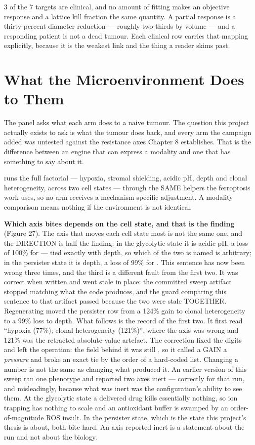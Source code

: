 \documentclass[11pt,twoside,openright]{report}
\begin{document}
3 of the 7 targets are clinical, and no amount of fitting makes an objective response and a lattice kill fraction the same quantity. A partial response is a thirty-percent diameter reduction --- roughly two-thirds by volume --- and a responding patient is not a dead tumour. Each clinical row carries that mapping explicitly, because it is the weakest link and the thing a reader skims past.

\section{What the Microenvironment Does to Them}

The panel asks what each arm does to a naive tumour. The question this project actually exists to ask is what the tumour does back, and every arm the campaign added was untested against the resistance axes Chapter 8 establishes. That is the difference between an engine that can express a modality and one that has something to say about it.

 runs the full factorial --- hypoxia, stromal shielding, acidic pH, depth and clonal heterogeneity, across two cell states --- through the SAME helpers the ferroptosis work uses, so no arm receives a mechanism-specific adjustment. A modality comparison means nothing if the environment is not identical.

\textbf{Which axis bites depends on the cell state, and that is the finding} (Figure 27). The axis that moves each cell state most is not the same one, and the DIRECTION is half the finding: in the glycolytic state it is acidic pH, a loss of 100\% for  --- tied exactly with depth, so which of the two is named is arbitrary; in the persister state it is depth, a loss of 99\% for . This sentence has now been wrong three times, and the third is a different fault from the first two. It was correct when written and went stale in place: the committed sweep artifact stopped matching what the code produces, and the guard comparing this sentence to that artifact passed because the two were stale TOGETHER. Regenerating moved the persister row from a 124\% gain to clonal heterogeneity to a 99\% loss to depth. What follows is the record of the first two. It first read ``hypoxia (77\%); clonal heterogeneity (121\%)'', where the axis was wrong and 121\% was the retracted absolute-value artefact. The correction fixed the digits and left the operation: the field behind it was still , so it called a GAIN a \textit{pressure} and broke an exact tie by the order of a hard-coded list. Changing a number is not the same as changing what produced it. An earlier version of this sweep ran one phenotype and reported two axes inert --- correctly for that run, and misleadingly, because what was inert was the configuration's ability to see them. At the glycolytic state a delivered drug kills essentially nothing, so ion trapping has nothing to scale and an antioxidant buffer is swamped by an order-of-magnitude ROS insult. In the persister state, which is the state this project's thesis is about, both bite hard. An axis reported inert is a statement about the run and not about the biology.
\end{document}
